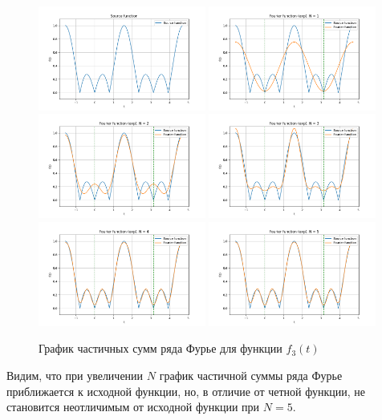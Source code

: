 \begin{figure}[ht!]
    \centering
    \includegraphics[width=0.49\textwidth]{media/plots/func_3.png}
    \includegraphics[width=0.49\textwidth]{media/plots/func_3_exp_N_1.png}
    \includegraphics[width=0.49\textwidth]{media/plots/func_3_exp_N_2.png}
    \includegraphics[width=0.49\textwidth]{media/plots/func_3_exp_N_3.png}
    \includegraphics[width=0.49\textwidth]{media/plots/func_3_exp_N_4.png}
    \includegraphics[width=0.49\textwidth]{media/plots/func_3_exp_N_5.png}
    \caption{График частичных сумм ряда Фурье для функции $f_3(t)$}
    \label{fig:func_3_plot_exp}
\end{figure}


Видим, что при увеличении $N$ график частичной суммы ряда Фурье приближается к исходной функции, но, в отличие от четной функции, не становится неотличимым от исходной функции при $N = 5$.
